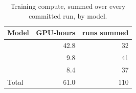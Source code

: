 \begin{table}[!htb]
  \centering
  \caption{Training compute, summed over every committed run, by model.}
  \label{tab:compute}
  \tblfont
  \begin{tabular}{lrr}
    \toprule
    Model & GPU-hours & runs summed \\
    \midrule
    \Mgnn{}      & 42.8 & 32 \\
    \Mfno{}      & 9.8  & 41 \\
    \Mtrans{}    & 8.4  & 37 \\
    \midrule
    Total        & 61.0 & 110 \\
    \bottomrule
  \end{tabular}
\end{table}

\prebib

